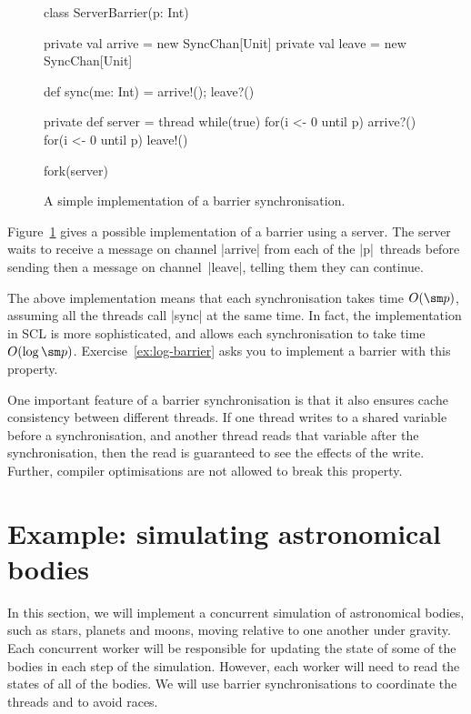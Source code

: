 
\begin{figure}
\begin{scala}
class ServerBarrier(p: Int){
  private val arrive = new SyncChan[Unit]
  private val leave = new SyncChan[Unit]

  def sync(me: Int) = { arrive!(); leave?() }

  private def server = thread{
    while(true){
      for(i <- 0 until p) arrive?()
      for(i <- 0 until p) leave!()
    }
  }

  fork(server)
}
\end{scala}
\caption{A simple implementation of a barrier synchronisation.}
\label{fig:serverBarrier}
\end{figure}

Figure~\ref{fig:serverBarrier} gives a possible implementation of a barrier
using a server.  The server waits to receive a message on channel |arrive|
from each of the |p|~threads before sending then a message on channel~|leave|,
telling them they can continue.

The above implementation means that each synchronisation takes time $O(\sm p)$,
assuming all the threads call |sync| at the same time.  In fact, the
implementation in SCL is more sophisticated, and allows each synchronisation
to take time $O(\log \sm p)$.  Exercise~\ref{ex:log-barrier} asks you to
implement a barrier with this property.

One important feature of a barrier synchronisation is that it also ensures
cache consistency between different threads.  If one thread writes to a shared
variable before a synchronisation, and another thread reads that variable
after the synchronisation, then the read is guaranteed to see the effects of
the write.  Further, compiler optimisations are not allowed to break this
property.  


\section{Example: simulating astronomical bodies}

In this section, we will implement a concurrent simulation of astronomical
bodies, such as stars, planets and moons, moving relative to one another under
gravity.  Each concurrent worker will be responsible for updating the state of
some of the bodies in each step of the simulation.  However, each worker will
need to read the states of all of the bodies.  We will use barrier
synchronisations to coordinate the threads and to avoid races.

